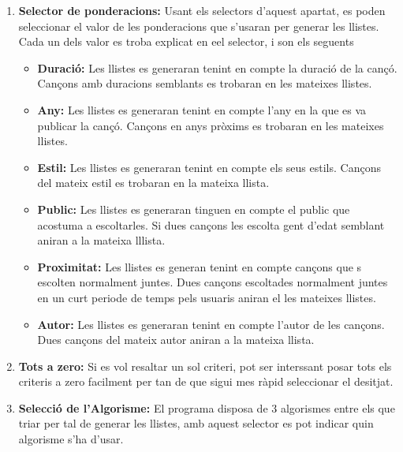 \documentclass[a4paper,10pt,oneside]{sphinxmanual}
\begin{document}
\begin{enumerate}
\item {} 
\textbf{Selector de ponderacions:} Usant els selectors d'aquest apartat, es poden seleccionar el valor de les ponderacions que s'usaran per generar les llistes. Cada un dels valor es troba explicat en eel selector, i son els seguents
\begin{itemize}
\item {} 
\textbf{Duració:} Les llistes es generaran tenint en compte la duració de la cançó. Cançons amb duracions semblants es trobaran en les mateixes llistes.

\item {} 
\textbf{Any:} Les llistes es generaran tenint en compte l'any en la que es va publicar la cançó. Cançons en anys pròxims es trobaran en les mateixes llistes.

\item {} 
\textbf{Estil:} Les llistes es generaran tenint en compte els seus estils. Cançons del mateix estil es trobaran en la mateixa llista.

\item {} 
\textbf{Public:} Les llistes es generaran tinguen en compte el public que acostuma a escoltarles. Si dues cançons les escolta gent d'edat semblant aniran a la mateixa lllista.

\item {} 
\textbf{Proximitat:}  Les llistes es generan tenint en compte cançons que s escolten normalment juntes. Dues cançons escoltades normalment juntes en un curt periode de temps pels usuaris aniran el les mateixes llistes.

\item {} 
\textbf{Autor:} Les llistes es generaran tenint en compte l'autor de les cançons. Dues cançons del mateix autor aniran a la mateixa llista.

\end{itemize}

\item {} 
\textbf{Tots a zero:} Si es vol resaltar un sol criteri, pot ser interssant posar tots els criteris a zero facilment per tan de que sigui mes ràpid seleccionar el desitjat.

\item {} 
\textbf{Selecció de l'Algorisme:} El programa disposa de 3 algorismes entre els que triar per tal de generar les llistes, amb aquest selector es pot indicar quin algorisme s'ha d'usar.

\end{enumerate}
\end{document}
